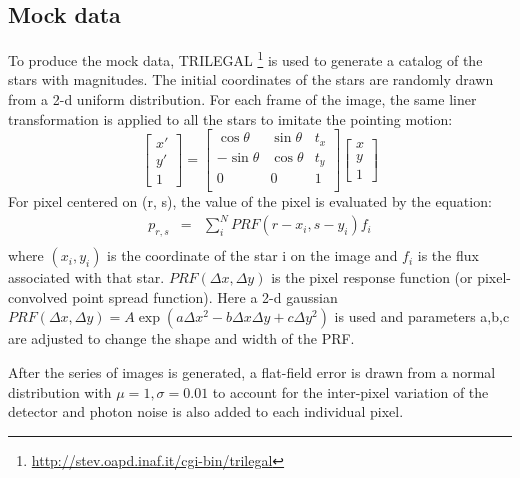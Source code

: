 \documentclass[12pt, preprint]{aastex}
\begin{document}
\subsection{Mock data}
To produce the mock data, TRILEGAL \footnote{\url{http://stev.oapd.inaf.it/cgi-bin/trilegal}} is used to generate a catalog of the stars with magnitudes. 
The initial coordinates of the stars are randomly drawn from a 2-d uniform distribution. 
For each frame of the image, the same liner transformation is applied  to all the stars to imitate the pointing motion:
\[
\begin{bmatrix}
    x' \\
    y' \\
    1
\end{bmatrix}
=
\begin{bmatrix}
    \cos \theta & \sin \theta & t_x \\
    -\sin \theta & \cos \theta & t_y \\
    0 & 0 & 1 \\
\end{bmatrix}
\begin{bmatrix}
    x \\
    y \\
    1
\end{bmatrix}
\] 
For pixel centered on (r, s), the value of the pixel is evaluated by the equation:
\begin{eqnarray}
p_{r,s} &=& \sum_{i}^{N} PRF(r-x_i, s-y_i) f_i\\
\end{eqnarray}
where $(x_i,y_i)$ is the coordinate of the star i on the image and $f_i$ is the flux associated with that star. 
$PRF(\Delta x, \Delta y)$ is the pixel response function (or pixel-convolved point spread function). 
Here a 2-d gaussian $PRF(\Delta x, \Delta y) = A \exp(a\Delta x^2-b\Delta x \Delta y+c\Delta y^2)$ is used and parameters a,b,c are adjusted to change the shape and width of the PRF.

After the series of images is generated, a flat-field error is drawn from a normal distribution with $\mu=1, \sigma=0.01$ to account for the inter-pixel variation of the detector and photon noise is also added to each individual pixel.
\end{document}
